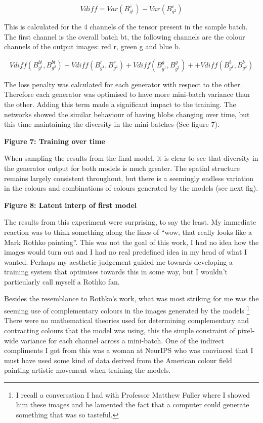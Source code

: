 \begin{equation}
    \label{eq:variance-gan}
    Vdiff = Var(B_{g^{1}}^{c}) - Var(B_{g^{2}}^{c})
    \end{equation}

This is calculated for the 4 channels of the tensor present in the sample batch. 
The first channel is the overall batch bt, the following channels are the colour channels of the output images: red r, green g and blue b.

\begin{equation}
    \label{eq:total-gan}
        Vdiff(B_{g^{1}}^{bt} , B_{g^{2}}^{bt}) + Vdiff(B_{g^{1}}^{r} , B_{g^{2}}^{r}) + Vdiff(B_{g^{1}}^{g} , B_{g^{2}}^{g}) + + Vdiff(B_{g^{1}}^{b} , B_{g^{2}}^{b}) 
    \end{equation}

The loss penalty was calculated for each generator with respect to the other. 
Therefore each generator was optimised to have more mini-batch variance than the other. 
Adding this term made a significant impact to the training. 
The networks showed the similar behaviour of having blobs changing over time, but this time maintaining the diversity in the mini-batches (See figure 7). 

\textbf{Figure 7: Training over time}

When sampling the results from the final model, it is clear to see that diversity in the generator output for both models is much greater. 
The spatial structure remains largely consistent throughout, but there is a seemingly endless variation in the colours and combinations of colours generated by the models (see next fig).

\textbf{Figure 8: Latent interp of first model}

The results from this experiment were surprising, to say the least. 
My immediate reaction was to think something along the lines of “wow, that really looks like a Mark Rothko painting”. 
This was not the goal of this work, I had no idea how the images would turn out and I had no real predefined idea in my head of what I wanted. 
Perhaps my aesthetic judgement guided me towards developing a training system that optimises towards this in some way, but I wouldn't particularly call myself a Rothko fan. 

Besides the resemblance to Rothko’s work, what was most striking for me was the seeming use of complementary colours in the images generated by the models \footnote{I recall a conversation I had with Professor Matthew Fuller where I showed him these images and he lamented the fact that a computer could generate something that was so tasteful.} 
There were no mathematical theories used for determining complementary and contracting colours that the model was using, this the simple constraint of pixel-wide variance for each channel across a mini-batch. 
One of the indirect compliments I got from this was a woman at NeurIPS who was convinced that I must have used some kind of data derived from the American colour field painting artistic movement when training the models.


